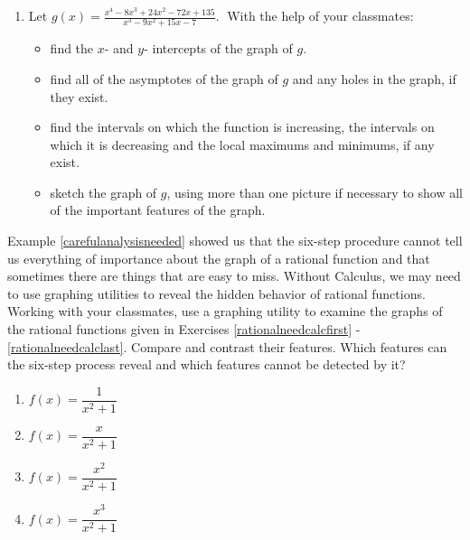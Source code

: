\begin{enumerate}
\setcounter{enumi}{\value{HW}}


\item Let $g(x) = \displaystyle \frac{x^{4} - 8x^{3} + 24x^{2} - 72x + 135}{x^{3} - 9x^{2} + 15x - 7}.\;$  With the help of your classmates:

\begin{itemize}

\item  find the $x$- and $y$- intercepts of the graph of $g$.  

\item   find all of the asymptotes of the graph of $g$ and any holes in the graph, if they exist.  

\item find the intervals on which the function is increasing, the intervals on which it is decreasing and the local maximums and minimums, if any exist.

\item sketch the graph of $g$, using more than one picture if necessary to show all of the important features of the graph.

\end{itemize}

\setcounter{HW}{\value{enumi}}
\end{enumerate}

Example \ref{carefulanalysisneeded} showed us that the six-step procedure cannot tell us everything of importance about the graph of a rational function and that sometimes there are things that are easy to miss.  Without Calculus, we may need to use graphing utilities to reveal the hidden behavior of rational functions.  Working with your classmates, use a graphing utility to examine the graphs of the rational functions given in Exercises \ref{rationalneedcalcfirst} - \ref{rationalneedcalclast}.  Compare and contrast their features.  Which features can the six-step process reveal and which features cannot be detected by it?

\begin{multicols}{4}
\begin{enumerate}
\setcounter{enumi}{\value{HW}}

\item $f(x) = \dfrac{1}{x^{2} + 1}$   \label{rationalneedcalcfirst}
\item $f(x) = \dfrac{x}{x^{2} + 1}$ 
\item $f(x) = \dfrac{x^{2}}{x^{2} + 1}$ 
\item $f(x) = \dfrac{x^{3}}{x^{2} + 1}$  \label{rationalneedcalclast}

\setcounter{HW}{\value{enumi}}
\end{enumerate}
\end{multicols}


